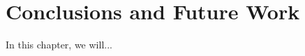 \chapter{Conclusions and Future Work}

\label{kap:conclusionAndFuture} %

In this chapter, we will...

